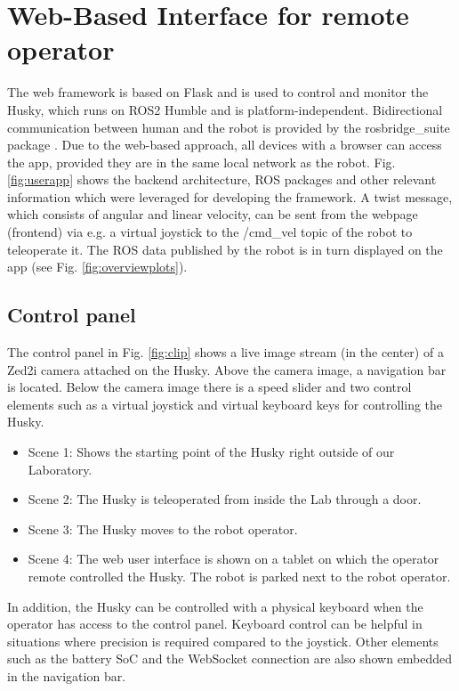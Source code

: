 \documentclass[letterpaper, 10 pt, conference]{ieeeconf}  %
\begin{document}
\section{Web-Based Interface for remote operator}
\label{sec:framework}

The web framework is based on Flask \cite{flask} and is used to control and monitor the Husky, which runs on ROS2 Humble and is platform-independent. 
Bidirectional communication between human and the robot is provided by the rosbridge\_suite package \cite{rosbridgeSuite}.   
Due to the web-based approach, all devices with a browser can access the app, provided they are in the same local network as the robot.
Fig. \ref{fig:userapp} shows the backend architecture, ROS packages and other relevant information which were leveraged for developing the framework. 
A twist message, which consists of angular and linear velocity, can be sent from the webpage (frontend) via e.g. 
a virtual joystick to the /cmd\_vel topic of the robot to teleoperate it. The ROS data published by the robot is in turn displayed on the app (see Fig. \ref{fig:overviewplots}).



\subsection{Control panel}
The control panel in Fig. \ref{fig:clip} shows a live image stream (in the center) of a Zed2i camera attached on the Husky. Above the camera image, a navigation bar is located. 
Below the camera image there is a speed slider and two control elements such as a virtual joystick and virtual keyboard keys for controlling the Husky.
\begin{itemize}
    \item Scene 1: Shows the starting point of the Husky right outside of our Laboratory. 
    \item Scene 2: The Husky is teleoperated from inside the Lab through a door.
    \item Scene 3: The Husky moves to the robot operator.
    \item Scene 4: The web user interface is shown on a tablet on which the operator remote controlled the Husky. The robot is parked next to the robot operator.
\end{itemize} 
In addition, the Husky can be controlled with a physical keyboard when the operator has access to the control panel. Keyboard control can be helpful in situations where precision is required compared to the joystick.
Other elements such as the battery SoC and the WebSocket connection are also shown embedded in the navigation bar.
\end{document}
